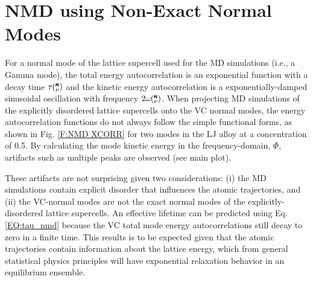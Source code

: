 \documentclass[12pt,twocolumn,iop]{/usr/share/texmf/tex/latex/iop/iopart}[/usr/share/texmf/tex/latex/iop/]
\newcommand{\kv}{\mspace{-4.0mu}\left(\mspace{-8.0mu}
\begin{smallmatrix}&\pmb{\kappa} \\&\nu\end{smallmatrix}
\mspace{-3.0mu}\right)}
\begin{document}

\section{\label{A:NMD XCORR}
NMD using Non-Exact Normal Modes}

For a normal mode of the lattice supercell 
used for the MD simulations (i.e., a Gamma mode), 
the total energy autocorrelation is an exponential function  
with a decay time $\tau\kv$ and the kinetic energy autocorrelation is a 
exponentially-damped sinusoidal oscillation with frequency 
$2\omega\kv$.\cite{mcgaughey_predicting_2013} 
When projecting MD simulations  
of the explicitly disordered lattice supercells 
onto the VC normal modes, 
the energy autocorrelation functions 
do not always follow the simple functional forms, 
as shown in Fig. \ref{F:NMD XCORR} for two modes in the LJ alloy at a 
concentration of 0.5.  
By calculating the mode kinetic energy in the  
frequency-domain, $\Phi$,\cite{larkin_comparison_2012} artifacts such as 
multiple peaks are observed (see main plot).   

These artifacts are not surprising given two considerations: 
(i) the MD simulations 
contain explicit disorder that influences the atomic trajectories, 
and (ii) the VC-normal modes are not the exact normal modes of the 
explicitly-disordered lattice supercells. 
An effective lifetime can be predicted 
using Eq. \eqref{EQ:tau_nmd} 
because the VC total mode energy autocorrelations 
still decay to zero in a finite time. This results is to be expected 
given that the atomic trajectories contain 
information about the lattice energy, which from general statistical 
physics principles will have exponential relaxation behavior in an 
equilibrium ensemble.
\cite{landau_statistical_1980,srivastava_physics_1990,rajabpour_thermal_2010}
\end{document}
